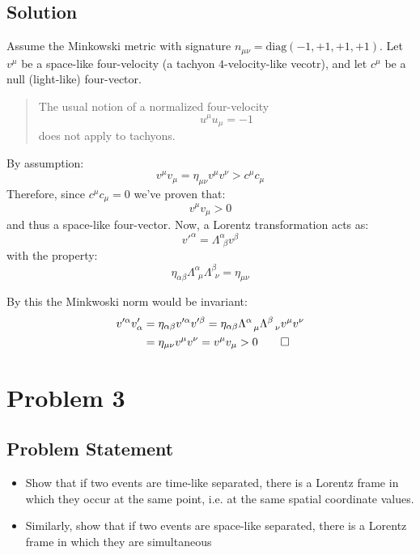 \documentclass[10pt,twocoloumn]{article}
\begin{document}
\subsection*{Solution}
Assume the Minkowski metric with signature $n_{\mu\nu} = \text{diag}(-1,+1,+1,+1)$. Let $v^\mu$ be a space-like four-velocity (a tachyon $4$-velocity-like vecotr), and let $c^\mu$ be a null (light-like) four-vector.
\begin{quote}
    The usual notion of a normalized four-velocity
    \begin{equation}
        u^\mu u_\mu = -1
    \end{equation}
    does not apply to tachyons.
\end{quote}
By assumption:
\begin{equation}
    v^\mu v_\mu = \eta_{\mu\nu} v^\mu v^\nu > c^\mu c_\mu
\end{equation}
Therefore, since $c^\mu c_\mu = 0$ we've proven that:
\begin{equation}
    v^\mu v_\mu >0
\end{equation}
and thus a space-like four-vector. Now, a Lorentz transformation acts as:
\begin{equation}
    v'^\alpha = \Lambda^\alpha_{\ \ \beta} v^\beta
\end{equation}
with the property:
\begin{equation}
\eta_{\alpha\beta}\Lambda^{\alpha}_{\ \ \mu}\Lambda^{\beta}_{\ \ \nu} = \eta_{\mu\nu}
\end{equation}

By this the Minkwoski norm would be invariant:
\begin{align}
    v'^\alpha v'_\alpha &= \eta_{\alpha\beta}v'^\alpha v'^\beta = \eta_{\alpha\beta}\Lambda^{\alpha}_{\ \ \mu}\Lambda^{\beta}_{\ \ \nu}v^\mu v^\nu \\
    &= \eta_{\mu\nu}v^{\mu}v^\nu = v^\mu v_\mu > 0 \qed
\end{align}
\section*{Problem 3}
\subsection*{Problem Statement}
\begin{itemize}
    \item Show that if two events are time-like separated, there is a Lorentz frame in which they occur at the same point, i.e. at the same spatial coordinate values.
    \item Similarly, show that if two events are space-like separated, there is a Lorentz frame in which they are simultaneous
\end{itemize}
\end{document}
